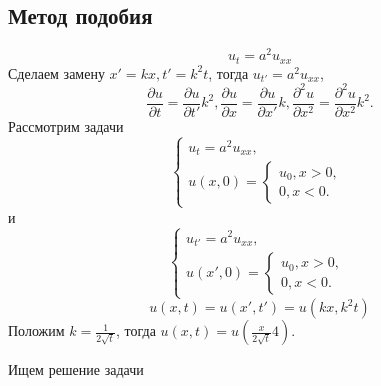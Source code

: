 \documentclass[11pt]{article}
\begin{document}
\subsection{Метод подобия}
\label{sec:org2ead656}
\begin{equation*}
u_t = a^2u_{xx}
\end{equation*}
Сделаем замену $x' = kx, t' = k^2t$, тогда $u_{t'} = a^2u_{xx}$,
\begin{equation}
\frac{\partial u}{\partial t} = \frac{\partial u}{\partial t'}k^2,
\frac{\partial u}{\partial x} = \frac{\partial u}{\partial x'}k,
\frac{\partial^2 u}{\partial x^2} = \frac{\partial^2 u}{\partial x^2}k^2.
\end{equation}
Рассмотрим задачи
\begin{equation}
\begin{cases}
u_t = a^2u_{xx}, \\
u(x, 0) = \begin{cases}
u_0, x > 0, \\
0, x < 0.
\end{cases}
\end{cases}
\end{equation}
и
\begin{equation}
\begin{cases}
u_{t'} = a^2u_{xx}, \\
u(x', 0) = \begin{cases}
u_0, x > 0, \\
0, x < 0.
\end{cases}
\end{cases}
\end{equation}
$$u(x, t) = u(x', t') = u(kx, k^2t)$$
Положим $k = \frac1{2\sqrt{t}}$, тогда $u(x, t) = u\left(\frac{x}{2\sqrt{t}}4\right)$.

Ищем решение задачи 
\end{document}
